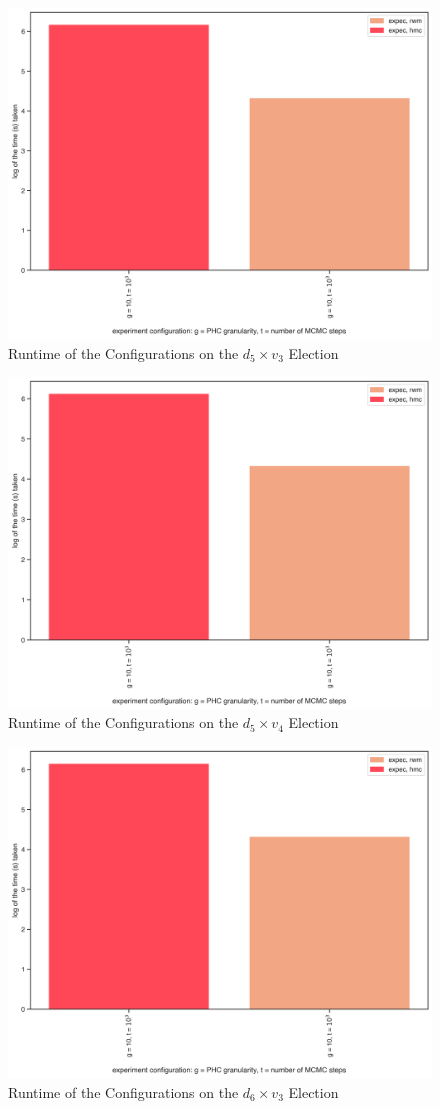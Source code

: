 \begin{figure}[ht]\centering
 \includegraphics[width=0.75\linewidth]{figures/5_3_time.png}
 \caption{Runtime of the Configurations on the $d_5 \times v_3$ Election}
 \label{fig:5_3_time}
\end{figure}

\begin{figure}[ht]\centering
 \includegraphics[width=0.75\linewidth]{figures/5_4_time.png}
 \caption{Runtime of the Configurations on the $d_5 \times v_4$ Election}
 \label{fig:5_4_time}
\end{figure}

\begin{figure}[ht]\centering
 \includegraphics[width=0.75\linewidth]{figures/6_3_time.png}
 \caption{Runtime of the Configurations on the $d_6 \times v_3$ Election}
 \label{fig:6_3_time}
\end{figure}

